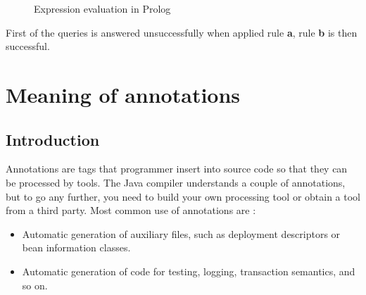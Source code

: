 \documentclass[11pt,twoside,a4paper]{book}
\begin{document}
\setlength{\parskip}{1cm plus4mm minus3mm}


\begin{figure}[ht]
\centering
{}
\caption{Expression evaluation in Prolog}

\end{figure}



First of the queries is answered unsuccessfully when applied rule \textbf{a},
rule \textbf{b} is then successful.


\chapter{Meaning of annotations}

\section{Introduction}
Annotations are tags that programmer insert into source code so that they
can be processed by tools. The Java compiler understands a couple of
annotations, but to go any further, you need to build your own processing tool
or obtain a tool from a third party. Most common use of annotations are
\cite{horstmannCornell:coreJava}:

\begin{itemize}
  \item Automatic generation of auxiliary files, such as deployment descriptors or bean information classes.
  \item Automatic generation of code for testing, logging, transaction semantics, and so on.
\end{itemize}
\end{document}
